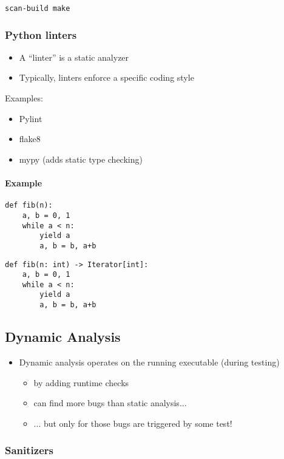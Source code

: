 \documentclass[12pt]{article}
\begin{document}
\begin{verbatim}
scan-build make
\end{verbatim}
\subsubsection{Python linters}
\begin{itemize}
\item A ``linter'' is a static analyzer
\item Typically, linters enforce a specific coding style
\end{itemize}

Examples:
\begin{itemize}
\item Pylint
\item flake8
\item mypy (adds static type checking)
\end{itemize}
\paragraph{Example}
\begin{verbatim}
def fib(n):
    a, b = 0, 1
    while a < n:
        yield a
        a, b = b, a+b
\end{verbatim}

\begin{verbatim}
def fib(n: int) -> Iterator[int]:
    a, b = 0, 1
    while a < n:
        yield a
        a, b = b, a+b
\end{verbatim}
\subsection{Dynamic Analysis}
\begin{itemize}
    \item Dynamic analysis operates on the running executable (during testing)
        \begin{itemize}
            \item by adding runtime checks
            \item can find more bugs than static analysis...
            \item ... but only for those bugs are triggered by some test!
        \end{itemize}
\end{itemize}
\subsubsection{Sanitizers}
\end{document}
